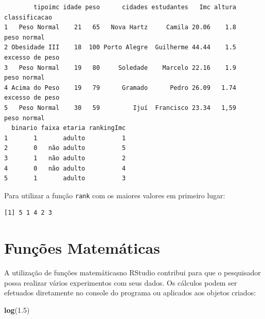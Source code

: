 \documentclass[12pt,brazil,oneside]{book}
\newenvironment{Shaded}{\begin{snugshade}}{\end{snugshade}}
\newcommand{\FloatTok}[1]{\textcolor[rgb]{0.00,0.00,0.81}{#1}}
\newcommand{\KeywordTok}[1]{\textcolor[rgb]{0.13,0.29,0.53}{\textbf{#1}}}
\newcommand{\NormalTok}[1]{#1}
\newcommand{\OperatorTok}[1]{\textcolor[rgb]{0.81,0.36,0.00}{\textbf{#1}}}
\begin{document}
\begin{Shaded}
\end{Shaded}

\begin{verbatim}
        tipoimc idade peso      cidades estudantes   Imc altura   classificacao
1   Peso Normal    21   65   Nova Hartz     Camila 20.06    1.8     peso normal
2 Obesidade III    18  100 Porto Alegre  Guilherme 44.44    1.5 excesso de peso
3   Peso Normal    19   80     Soledade    Marcelo 22.16    1.9     peso normal
4 Acima do Peso    19   79      Gramado      Pedro 26.09   1.74 excesso de peso
5   Peso Normal    30   59         Ijuí  Francisco 23.34   1,59     peso normal
  binario faixa etaria rankingImc
1       1       adulto          1
2       0   não adulto          5
3       1   não adulto          2
4       0   não adulto          4
5       1       adulto          3
\end{verbatim}

Para utilizar a função \texttt{rank} com os maiores valores em primeiro lugar:

\begin{Shaded}
\end{Shaded}

\begin{verbatim}
[1] 5 1 4 2 3
\end{verbatim}

\hypertarget{funcoes-matematicas}{%
\section{Funções Matemáticas}\label{funcoes-matematicas}}

A utilização de funções matemáticasno RStudio contribui para que o pesquisador possa realizar vários experimentos com seus dados. Os cálculos podem ser efetuados diretamente no console do programa ou aplicados aos objetos criados:

\begin{Shaded}
\begin{Highlighting}[]
\KeywordTok{log}\NormalTok{(}\FloatTok{1.5}\NormalTok{)}
\end{Highlighting}
\end{Shaded}
\end{document}
